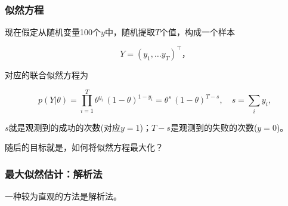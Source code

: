     \begin{center}
    \end{center}
    { \hspace*{\fill} \\}

\subsubsection{似然方程}\label{ux4f3cux7136ux65b9ux7a0b}
现在假定从随机变量100个\(y\)中，随机提取\(T\)个值，构成一个样本

\begin{equation}
Y = \left(y_1, \ldots y_{T} \right)^{\top}，
\end{equation}

对应的联合似然方程为

\begin{equation}
p(Y|\theta) = \prod_{i=1}^{T} \theta^{y_{i}} \, \left( 1 - \theta \right)^{1-y_{i}} = \theta^{s} \, \left( 1-\theta \right)^{T - s}, \quad s = \sum_{i} y_{i},
\end{equation}

\(s\)就是观测到的成功的次数(对应\(y=1\))；\(T-s\)是观测到的失败的次数(\(y=0\))。

随后的目标就是，如何将似然方程最大化？

\subsubsection{最大似然估计：解析法}
\label{ux6700ux5927ux4f3cux7136ux4f30ux8ba1ux89e3ux6790ux6cd5}

一种较为直观的方法是解析法。

